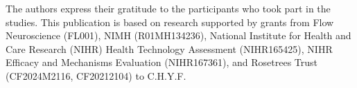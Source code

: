 The authors express their gratitude to the participants who took part in the studies. This publication is based on research supported by grants from Flow Neuroscience (FL001), NIMH (R01MH134236), National Institute for Health and Care Research (NIHR) Health Technology Assessment (NIHR165425), NIHR Efficacy and Mechanisms Evaluation (NIHR167361), and Rosetrees Trust (CF2024M2116, CF20212104) to C.H.Y.F.
